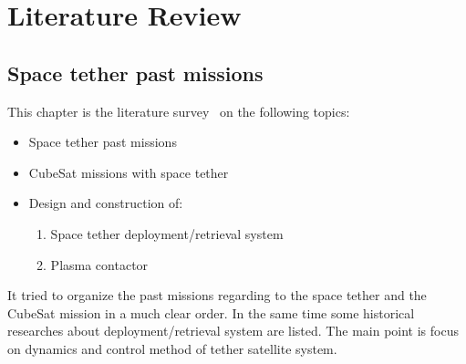 \chapter{Literature Review}\label{sec-literature}
\section{Space tether past missions}
This chapter is the literature survey~\cite{chen2013history,chen2014dynamical} on the following topics:
\begin{itemize}
\item Space tether past missions
\item CubeSat missions with space tether
\item Design and construction of:
\begin{enumerate}
\item Space tether deployment/retrieval system
\item Plasma contactor
\end{enumerate}
\end{itemize}

It tried to organize the past missions regarding to the space tether and the CubeSat mission in a much clear order. In the same time some historical researches about deployment/retrieval system are listed. The main point is focus on dynamics and control method of tether satellite system.
